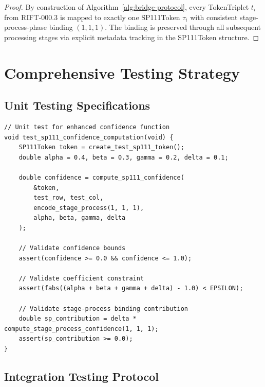 \documentclass[11pt,a4paper]{article}
\theoremstyle{definition}
\theoremstyle{remark}
\begin{document}
\begin{proof}
By construction of Algorithm~\ref{alg:bridge-protocol}, every TokenTriplet $t_i$ from RIFT-000.3 is mapped to exactly one SP111Token $\tau_i$ with consistent stage-process-phase binding $(1,1,1)$. The binding is preserved through all subsequent processing stages via explicit metadata tracking in the SP111Token structure.
\end{proof}


\section{Comprehensive Testing Strategy}
\label{sec:testing-framework}

\subsection{Unit Testing Specifications}
\label{subsec:unit-testing}

\begin{lstlisting}[style=riftstyle, caption={SP111 Confidence Threshold Testing}, label=lst:confidence-tests]
// Unit test for enhanced confidence function
void test_sp111_confidence_computation(void) {
    SP111Token token = create_test_sp111_token();
    double alpha = 0.4, beta = 0.3, gamma = 0.2, delta = 0.1;
    
    double confidence = compute_sp111_confidence(
        &token, 
        test_row, test_col, 
        encode_stage_process(1, 1, 1),
        alpha, beta, gamma, delta
    );
    
    // Validate confidence bounds
    assert(confidence >= 0.0 && confidence <= 1.0);
    
    // Validate coefficient constraint  
    assert(fabs((alpha + beta + gamma + delta) - 1.0) < EPSILON);
    
    // Validate stage-process binding contribution
    double sp_contribution = delta * compute_stage_process_confidence(1, 1, 1);
    assert(sp_contribution >= 0.0);
}
\end{lstlisting}

\subsection{Integration Testing Protocol}
\label{subsec:integration-testing}
\end{document}
